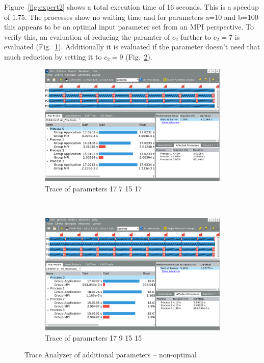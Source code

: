 \documentclass[article]{scrartcl}
\begin{document}
Figure~\ref{fig:expert2} shows a total execution time of 16 seconds. This is a speedup of $1.75$. 
The processes show no waiting time and for parameters a=10 and b=100 this appears to be an optimal input parameter set from an MPI perspective.
To verify this, an evaluation of reducing the paramter of $c_2$ further to $c_2=7$ is evaluated (Fig.~\ref{fig:expert3a}).
Additionally it is evaluated if the parameter doesn't need that much reduction by setting it to $c_2=9$ (Fig.~\ref{fig:expert3b}).

\begin{figure}[htpb]
	\centering
    \begin{subfigure}{\textwidth}
	\centering
	\includegraphics[width=.9\textwidth,keepaspectratio=true]{../figs/4_3_17_7_15_17.png}
	\caption{Trace of parameters 17 7 15 17}
	\label{fig:expert3a}
    \end{subfigure}
~\newline
~\newline
    \begin{subfigure}{\textwidth}
	\centering
	\includegraphics[width=.9\textwidth,keepaspectratio=true]{../figs/4_3_17_9_15_15.png}
	\caption{Trace of parameters 17 9 15 15}
	\label{fig:expert3b}
    \end{subfigure}
	\caption{Trace Analyzer of additional parameters -- non-optimal} 
    \label{fig:expert3}
\end{figure}
\end{document}
